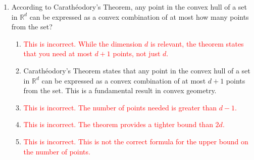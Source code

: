 \documentclass{article}%
\newcommand{\incorrect}[1]{\textcolor{red}{#1}}
\begin{document}
\begin{enumerate}
\begin{enumerate}%
\item Carathéodory's Theorem states that any point in the convex hull of a set in $\mathbb{R}^d$ can be expressed as a convex combination of at most $d+1$ points from the set.  In linear programming, this is significant because the feasible region is a convex set, and the optimal solution is always found at an extreme point (vertex) of this region.  The theorem implies that we don't need to examine every point in the feasible region; we only need to consider combinations of at most $d+1$ points.%
\item \incorrect{While the theorem reduces the number of points to consider, it's at most $d+1$, not $d$.}%
\item \incorrect{The theorem doesn't directly provide an upper bound on simplex iterations, although it indirectly influences the complexity by limiting the number of extreme points that need to be considered.}%
\item \incorrect{The optimal solution is at a vertex, but the theorem doesn't state that it's a combination of exactly $d$ points.}%
\item \incorrect{The number of points is at most $d+1$, not $d^2$.}%
\end{enumerate}%
\vspace{1em}%
\item According to Carathéodory's Theorem, any point in the convex hull of a set in $\mathbb{R}^d$ can be expressed as a convex combination of at most how many points from the set?%
\begin{enumerate}%
\item \incorrect{This is incorrect. While the dimension $d$ is relevant, the theorem states that you need at most $d+1$ points, not just $d$.}%
\item Carathéodory's Theorem states that any point in the convex hull of a set in $\mathbb{R}^d$ can be expressed as a convex combination of at most $d+1$ points from the set.  This is a fundamental result in convex geometry.%
\item \incorrect{This is incorrect. The number of points needed is greater than $d-1$.}%
\item \incorrect{This is incorrect. The theorem provides a tighter bound than $2d$.}%
\item \incorrect{This is incorrect. This is not the correct formula for the upper bound on the number of points.}%
\end{enumerate}%
\vspace{1em}%

\end{enumerate}
\end{document}
